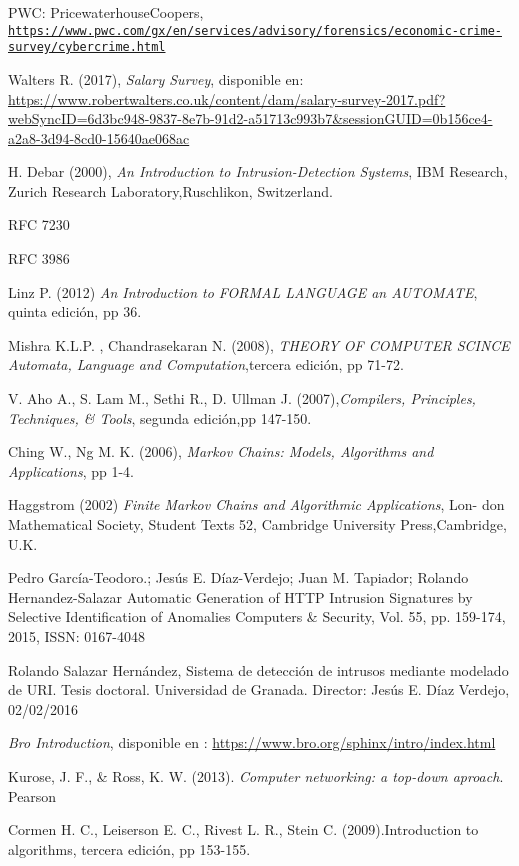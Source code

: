 \begin{thebibliography}{99}
PWC: PricewaterhouseCoopers,
\\\texttt{\url{https://www.pwc.com/gx/en/services/advisory/forensics/economic-crime-survey/cybercrime.html}}

Walters R. (2017), \textit{Salary Survey}, disponible en: \url{https://www.robertwalters.co.uk/content/dam/salary-survey-2017.pdf?webSyncID=6d3bc948-9837-8e7b-91d2-a51713c993b7&sessionGUID=0b156ce4-a2a8-3d94-8cd0-15640ae068ac}

H.   Debar (2000), \textit{An Introduction to Intrusion-Detection Systems},  IBM   Research,   Zurich   Research   Laboratory,Ruschlikon, Switzerland.

RFC 7230

RFC 3986

Linz P. (2012) \textit{An Introduction to FORMAL LANGUAGE an AUTOMATE}, quinta edición, pp 36.

Mishra K.L.P. , Chandrasekaran N. (2008), \textit{THEORY OF COMPUTER SCINCE Automata, Language and Computation},tercera edición, pp 71-72.

V. Aho A., S. Lam M., Sethi R., D. Ullman J. (2007),\textit{Compilers, Principles, Techniques, \& Tools}, segunda edición,pp 147-150.

Ching W., Ng M. K. (2006), \textit{Markov Chains: Models, Algorithms and Applications}, pp 1-4.

Haggstrom (2002) \textit{Finite Markov Chains and Algorithmic Applications}, Lon-
don Mathematical Society, Student Texts 52, Cambridge University Press,Cambridge, U.K.

Pedro García-Teodoro.; Jesús E. Díaz-Verdejo; Juan M. Tapiador; Rolando Hernandez-Salazar
Automatic Generation of HTTP Intrusion Signatures by Selective Identification of Anomalies
Computers \& Security, Vol. 55, pp. 159-174, 2015, ISSN: 0167-4048 

Rolando Salazar Hernández, Sistema de detección de intrusos mediante modelado de URI. Tesis doctoral. Universidad de Granada. Director: Jesús E. Díaz Verdejo, 02/02/2016

\textit{Bro Introduction}, disponible en : \url{https://www.bro.org/sphinx/intro/index.html}

Kurose, J. F., \& Ross, K. W. (2013). \textit{Computer networking: a top-down aproach}. Pearson

 Cormen H. C., Leiserson E. C., Rivest L. R., Stein C. (2009).Introduction to algorithms, tercera edición, pp 153-155.

\end{thebibliography}